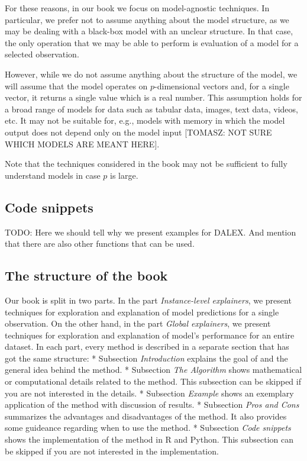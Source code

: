 \documentclass[]{krantz}
\theoremstyle{definition}
\theoremstyle{definition}
\theoremstyle{definition}
\theoremstyle{remark}
\begin{document}
For these reasons, in our book we focus on model-agnostic techniques. In
particular, we prefer not to assume anything about the model structure,
as we may be dealing with a black-box model with an unclear structure.
In that case, the only operation that we may be able to perform is
evaluation of a model for a selected observation.

However, while we do not assume anything about the structure of the
model, we will assume that the model operates on \(p\)-dimensional
vectors and, for a single vector, it returns a single value which is a
real number. This assumption holds for a broad range of models for data
such as tabular data, images, text data, videos, etc. It may not be
suitable for, e.g., models with memory in which the model output does
not depend only on the model input {[}TOMASZ: NOT SURE WHICH MODELS ARE
MEANT HERE{]}.

Note that the techniques considered in the book may not be sufficient to
fully understand models in case \(p\) is large.

\hypertarget{code-snippets}{%
\subsection{Code snippets}\label{code-snippets}}

TODO: Here we should tell why we present examples for DALEX. And mention
that there are also other functions that can be used.

\hypertarget{the-structure-of-the-book}{%
\subsection{The structure of the book}\label{the-structure-of-the-book}}

Our book is split in two parts. In the part \emph{Instance-level
explainers}, we present techniques for exploration and explanation of
model predictions for a single observation. On the other hand, in the
part \emph{Global explainers}, we present techniques for exploration and
explanation of model's performance for an entire dataset. In each part,
every method is described in a separate section that has got the same
structure: * Subsection \emph{Introduction} explains the goal of and the
general idea behind the method. * Subsection \emph{The Algorithm} shows
mathematical or computational details related to the method. This
subsection can be skipped if you are not interested in the details. *
Subsection \emph{Example} shows an exemplary application of the method
with discussion of results. * Subsection \emph{Pros and Cons} summarizes
the advantages and disadvantages of the method. It also provides some
guideance regarding when to use the method. * Subsection \emph{Code
snippets} shows the implementation of the method in R and Python. This
subsection can be skipped if you are not interested in the
implementation.
\end{document}
